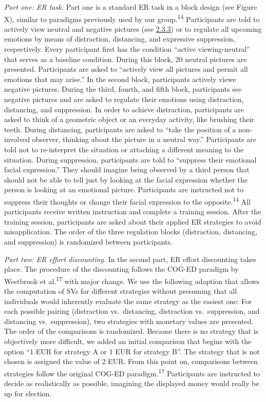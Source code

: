 \documentclass[
  english,
  man,floatsintext]{apa6}
\begin{document}
\emph{Part one: ER task.} Part one is a standard ER task in a block design (see Figure X), similar to paradigms previously used by our group.\textsuperscript{14}
Participants are told to actively view neutral and negative pictures (see \protect\hyperlink{ux5cux23stimuli}{2.3.3}) or to regulate all upcoming emotions by means of distraction, distancing, and expressive suppression, respectively.
Every participant first has the condition ``active viewing-neutral'' that serves as a baseline condition.
During this block, 20 neutral pictures are presented.
Participants are asked to ``actively view all pictures and permit all emotions that may arise.'' In the second block, participants actively viewe negative pictures.
During the third, fourth, and fifth block, participants see negative pictures and are asked to regulate their emotions using distraction, distancing, and suppression.
In order to achieve distraction, participants are asked to think of a geometric object or an everyday activity, like brushing their teeth.
During distancing, participants are asked to ``take the position of a non-involved observer, thinking about the picture in a neutral way.'' Participants are told not to re-interpret the situation or attaching a different meaning to the situation.
During suppression, participants are told to ``suppress their emotional facial expression.'' They should imagine being observed by a third person that should not be able to tell just by looking at the facial expression whether the person is looking at an emotional picture.
Participants are instructed not to suppress their thoughts or change their facial expression to the opposite.\textsuperscript{14}
All participants receive written instruction and complete a training session.
After the training session, participants are asked about their applied ER strategies to avoid misapplication.
The order of the three regulation blocks (distraction, distancing, and suppression) is randomized between participants.

\emph{Part two: ER effort discounting.} In the second part, ER effort discounting takes place.
The procedure of the discounting follows the COG-ED paradigm by Westbrook et al.\textsuperscript{17} with major change.
We use the following adaption that allows the computation of SVs for different strategies without presuming that all individuals would inherently evaluate the same strategy as the easiest one: For each possible pairing (distraction vs.~distancing, distraction vs.~suppression, and distancing vs.~suppression), two strategies with monetary values are presented.
The order of the comparisons is randomized.
Because there is no strategy that is objectively more difficult, we added an initial comparison that begins with the option ``1 EUR for strategy A or 1 EUR for strategy B''.
The strategy that is not chosen is assigned the value of 2 EUR.
From this point on, comparisons between strategies follow the original COG-ED paradigm.\textsuperscript{17}
Participants are instructed to decide as realistically as possible, imagining the displayed money would really be up for election.
\end{document}
